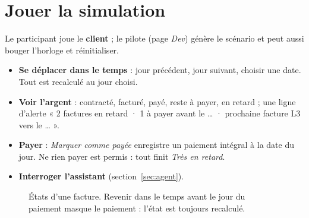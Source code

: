 \documentclass[11pt,a4paper]{article}
\newcommand{\statut}[1]{\textit{#1}}
\begin{document}
\section{Jouer la simulation}

Le participant joue le \textbf{client} ; le pilote (page \emph{Dev}) génère le scénario et peut aussi bouger l'horloge et réinitialiser.

\begin{itemize}
  \item \textbf{Se déplacer dans le temps} : jour précédent, jour suivant, choisir une date. Tout est recalculé au jour choisi.
  \item \textbf{Voir l'argent} : contracté, facturé, payé, reste à payer, \textcolor{danger}{en retard} ; une ligne d'alerte « 2 factures en retard · 1 à payer avant le … · prochaine facture L3 vers le … ».
  \item \textbf{Payer} : \emph{Marquer comme payée} enregistre un paiement intégral à la date du jour. Ne rien payer est permis : tout finit \statut{Très en retard}.
  \item \textbf{Interroger l'assistant} (section~\ref{sec:agent}).
\end{itemize}

\begin{figure}[H]\centering
{}
\caption{États d'une facture. Revenir dans le temps avant le jour du paiement masque le paiement : l'état est toujours recalculé.}
\end{figure}
\end{document}
